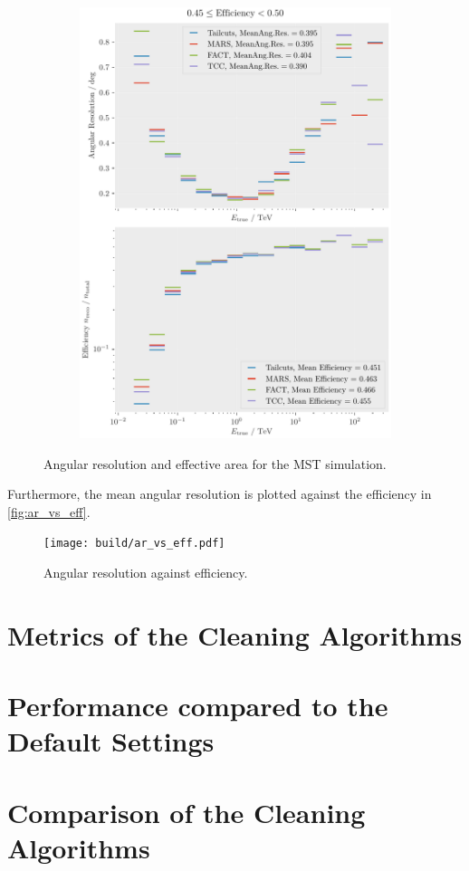 \begin{figure}
\begin{subfigure}{0.45\textwidth}
        \includegraphics[width=\textwidth]{plots/ar_aeff/AR_Aeff_MST_0.45_0.50.pdf}
    \end{subfigure}
    \caption{Angular resolution and effective area for the MST simulation.}
    \label{fig:efficiency_angres}
\end{figure}

Furthermore, the mean angular resolution is plotted against the efficiency in \autoref{fig:ar_vs_eff}.

\begin{figure}
    \centering
    \texttt{[image: build/ar\_vs\_eff.pdf]}
    \caption{Angular resolution against efficiency.}
    \label{fig:ar_vs_eff}
\end{figure}

\section{Metrics of the Cleaning Algorithms}
\label{sec:metrics}




\section{Performance compared to the Default Settings}
\label{sec:performance}


\section{Comparison of the Cleaning Algorithms}
\label{sec:comparison}
